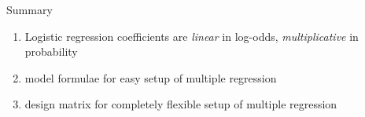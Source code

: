 \documentclass[
  ignorenonframetext,
]{beamer}
\providecommand{\tightlist}{%
  \setlength{\itemsep}{0pt}\setlength{\parskip}{0pt}}
\begin{document}
\begin{frame}{Summary}
\protect\hypertarget{summary}{}

\begin{enumerate}
\tightlist
\item
  Logistic regression coefficients are \emph{linear} in log-odds,
  \emph{multiplicative} in probability
\item
  model formulae for easy setup of multiple regression
\item
  design matrix for completely flexible setup of multiple regression
\end{enumerate}

\end{frame}
\end{document}
